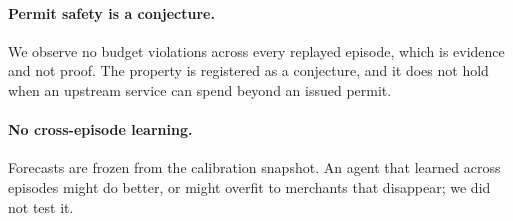 \paragraph{Permit safety is a conjecture.}
We observe no budget violations across every replayed episode, which is evidence and
not proof. The property is registered as a conjecture, and it does not hold when an
upstream service can spend beyond an issued permit.

\paragraph{No cross-episode learning.}
Forecasts are frozen from the calibration snapshot. An agent that learned across
episodes might do better, or might overfit to merchants that disappear; we did not
test it.

